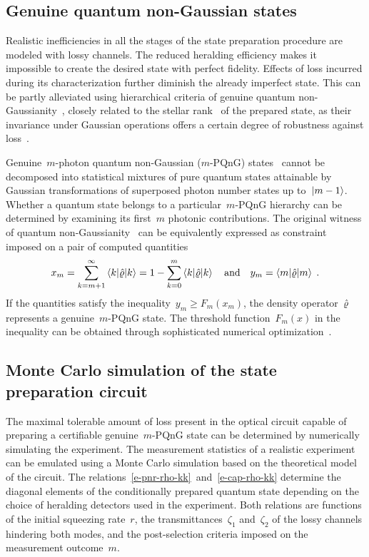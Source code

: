 \documentclass{optica-article}
\begin{document}
%

\subsection*{Genuine quantum non-Gaussian states}

Realistic inefficiencies in all the stages of the state preparation procedure are modeled with lossy channels. The reduced heralding efficiency makes it impossible to create the desired state with perfect fidelity. Effects of loss incurred during its characterization further diminish the already imperfect state. This can be partly alleviated using hierarchical criteria of genuine quantum non-Gaussianity~\cite{lachman2019}, closely related to the stellar rank~\cite{chabaud2020,walschaers2021,fiurasek2022} of the prepared state, as their invariance under Gaussian operations offers a certain degree of robustness against loss~\cite{lachman2019}.

Genuine~$m$-photon quantum non-Gaussian ($m$-PQnG) states~\cite{lachman2019} cannot be decomposed into statistical mixtures of pure quantum states attainable by Gaussian transformations of superposed photon number states up to~${\ket{m - 1}}$. Whether a quantum state belongs to a particular~$m$-PQnG hierarchy can be determined by examining its first~$m$ photonic contributions. The original witness of quantum non-Gaussianity~\cite{lachman2019} can be equivalently expressed as constraint~\cite{fiurasek2022} imposed on a pair of computed quantities
%
\begin{equation}
  x_{m} 
    = \sum_{k = m + 1}^{\infty} 
      \braket{k | \hat{\varrho} | k}
    = 1 - \sum_{k = 0}^{m} 
      \braket{k | \hat{\varrho} | k}
  \quad\text{and}\quad
  y_{m} = \braket{m | \hat{\varrho} | m}
  \;\text{.}
\end{equation}
%
If the quantities satisfy the inequality~${y_{m} \geq F_{m} (x_{m})}$, the density operator~$\hat{\varrho}$ represents a genuine~$m$-PQnG state. The threshold function~$F_{m}(x)$ in the inequality can be obtained through sophisticated numerical optimization~\cite{lachman2019,fiurasek2022}.

%

\subsection*{Monte Carlo simulation of the state preparation circuit}

The maximal tolerable amount of loss present in the optical circuit capable of preparing a certifiable genuine~$m$-PQnG state can be determined by numerically simulating the experiment. The measurement statistics of a realistic experiment can be emulated using a Monte Carlo simulation based on the theoretical model of the circuit. The relations~\eqref{e-pnr-rho-kk}~and~\eqref{e-cap-rho-kk} determine the diagonal elements of the conditionally prepared quantum state depending on the choice of heralding detectors used in the experiment. Both relations are functions of the initial squeezing rate~$r$, the transmittances~$\zeta_{1}$ and~$\zeta_{2}$ of the lossy channels hindering both modes, and the post-selection criteria imposed on the measurement outcome~$m$.
\end{document}

